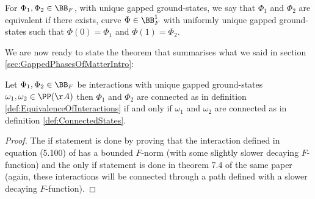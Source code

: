 \begin{definition}\label{def:EquivalenceOfInteractions}
	For $\Phi_1,\Phi_2\in\BB_F$, with unique gapped ground-states, we say that $\Phi_1$ and $\Phi_2$ are equivalent if there exists, curve $\Phi\in\BB^1_F$ with uniformly unique gapped ground-states such that $\Phi(0)=\Phi_1$ and $\Phi(1)=\Phi_2$.
\end{definition}
We are now ready to state the theorem that summarises what we said in section \ref{sec:GappedPhasesOfMatterIntro}:
\begin{theorem}\label{thrm:EquivalenceOfDefinitionsOfGappedPhasesOfMatter}
	Let $\Phi_1,\Phi_2\in\BB_F$ be interactions with unique gapped ground-states $\omega_1,\omega_2\in\PP(\AA)$ then $\Phi_1$ and $\Phi_2$ are connected as in definition \ref{def:EquivalenceOfInteractions} if and only if $\omega_1$ and $\omega_2$ are connected as in definition \ref{def:ConnectedStates}.
\end{theorem}
\begin{proof}
	The if statement is done by proving that the interaction defined in equation (5.100) of \cite{nachtergaele2019quasi} has a bounded $F$-norm (with some slightly slower decaying $F$-function) and the only if statement is done in theorem 7.4 of the same paper (again, these interactions will be connected through a path defined with a slower decaying $F$-function).
\end{proof}
